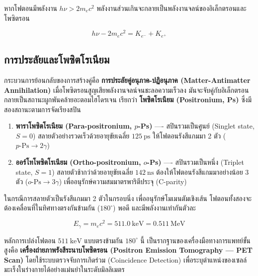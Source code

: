 หากโฟตอนมีพลังงาน $h\nu > 2m_e c^2$ พลังงานส่วนเกินจะกลายเป็นพลังงานจลน์ของอิเล็กตรอนและโพซิตรอน

\begin{equation}
h\nu - 2 m_e c^2 = K_{e^-} + K_{e^+}
\label{eq:pair_kinetic_excess}
\end{equation}

\subsection{การประลัยและโพซิตโรเนียม}

กระบวนการย้อนกลับของการสร้างคู่คือ \textbf{การประลัยคู่อนุภาค-ปฏิอนุภาค (Matter-Antimatter Annihilation)} เมื่อโพซิตรอนสูญเสียพลังงานจลน์จนชะลอความเร็วลง มันจะจับคู่กับอิเล็กตรอนกลายเป็นสถานะผูกพันคล้ายอะตอมไฮโดรเจน เรียกว่า \textbf{โพซิตโรเนียม (Positronium, Ps)} ซึ่งมีสองสถานะตามการจัดเรียงสปิน
\begin{enumerate}
    \item \textbf{พาราโพซิตโรเนียม (Para-positronium, $p$-Ps)} ---- สปินรวมเป็นศูนย์ (Singlet state, $S = 0$) สลายตัวอย่างรวดเร็วด้วยอายุขัยเฉลี่ย $125~\text{ps}$ ให้โฟตอนรังสีแกมมา 2 ตัว ($p\text{-Ps} \to 2\gamma$)
    \item \textbf{ออร์โทโพซิตโรเนียม (Ortho-positronium, $o$-Ps)} ---- สปินรวมเป็นหนึ่ง (Triplet state, $S = 1$) สลายตัวช้ากว่าด้วยอายุขัยเฉลี่ย $142~\text{ns}$ ต้องให้โฟตอนรังสีแกมมาอย่างน้อย 3 ตัว ($o\text{-Ps} \to 3\gamma$) เพื่ออนุรักษ์ความสมมาตรพาริตีประจุ (C-parity)
\end{enumerate}

ในกรณีการสลายตัวเป็นรังสีแกมมา 2 ตัวในกรอบนิ่ง เพื่ออนุรักษ์โมเมนตัมเชิงเส้น โฟตอนทั้งสองจะต้องเคลื่อนที่ในทิศทางตรงกันข้ามกัน ($180^\circ$) พอดี และมีพลังงานเท่ากันตัวละ

\begin{equation}
E_\gamma = m_e c^2 = 511.0~\text{keV} = 0.511~\text{MeV}
\label{eq:annihilation_photon_energy}
\end{equation}

หลักการเปล่งโฟตอน $511~\text{keV}$ แบบตรงข้ามกัน $180^\circ$ นี้ เป็นรากฐานของเครื่องมือทางการแพทย์ขั้นสูงคือ \textbf{เครื่องถ่ายภาพรังสีระนาบโพซิตรอน (Positron Emission Tomography --- PET Scan)} โดยใช้ระบบตรวจจับการเกิดร่วม (Coincidence Detection) เพื่อระบุตำแหน่งของเซลล์มะเร็งในร่างกายได้อย่างแม่นยำในระดับมิลลิเมตร

